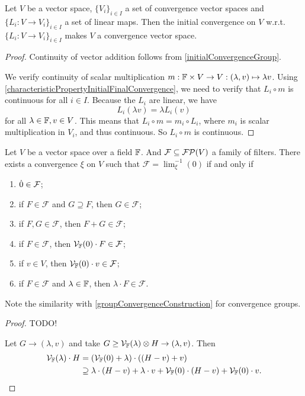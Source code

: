 \begin{proposition}
Let $V$ be a vector space, $\{V_i\}_{i\in I}$ a set of convergence vector spaces and $\{L_i: V \to V_i\}_{i\in I}$ a set of linear maps. Then the initial convergence on $V$ w.r.t. $\{L_i: V \to V_i\}_{i\in I}$ makes $V$ a convergence vector space.
\end{proposition}
\begin{proof}
Continuity of vector addition follows from \ref{initialConvergenceGroup}.

We verify continuity of scalar multiplication $m: \mathbb{F}\times V \to V: (\lambda, v) \mapsto \lambda v$. Using \ref{characteristicPropertyInitialFinalConvergence}, we need to verify that $L_i\circ m$ is continuous for all $i\in I$. Because the $L_i$ are linear, we have
\[ L_i(\lambda v) = \lambda L_i(v) \]
for all $\lambda \in \mathbb{F}, v \in V$. This means that $L_i\circ m = m_i \circ L_i$, where $m_i$ is scalar multiplication in $V_i$, and thus continuous. So $L_i \circ m$ is continuous.
\end{proof}

\begin{lemma} \label{vectorSpaceConvergenceConstruction}
Let $V$ be a vector space over a field $\mathbb{F}$. And $\mathcal{F} \subseteq \mathcal{FP}(V)$ a family of filters. There exists a convergence $\xi$ on $V$ such that $\mathcal{F} = \lim^{-1}_\xi(0)$ \textup{if and only if}
\begin{enumerate}
\item $\dot{0} \in \mathcal{F}$;
\item if $F \in \mathcal{F}$ and $G\supseteq F$, then $G\in \mathcal{F}$;
\item if $F,G \in \mathcal{F}$, then $F + G\in \mathcal{F}$;
\item if $F\in \mathcal{F}$, then $\mathcal{V}_{\mathbb{F}}(0)\cdot F \in \mathcal{F}$;
\item if $v\in V$, then $\mathcal{V}_{\mathbb{F}}(0)\cdot v \in \mathcal{F}$;
\item if $F\in \mathcal{F}$ and $\lambda\in \mathbb{F}$, then $\lambda\cdot F \in \mathcal{F}$.
\end{enumerate}
\end{lemma}
Note the similarity with \ref{groupConvergenceConstruction} for convergence groups.
\begin{proof}
TODO!

Let $G \to (\lambda, v)$ and take $G \geq \mathcal{V}_{\mathbb{F}}(\lambda)\otimes H \to (\lambda, v)$. Then
\begin{align*}
\mathcal{V}_{\mathbb{F}}(\lambda)\cdot H &= (\mathcal{V}_{\mathbb{F}}(0) + \lambda)\cdot((H - v) + v) \\
&\supseteq \lambda\cdot(H-v) + \lambda \cdot v + \mathcal{V}_{\mathbb{F}}(0)\cdot (H-v) + \mathcal{V}_{\mathbb{F}}(0)\cdot v.
\end{align*}
\end{proof}

